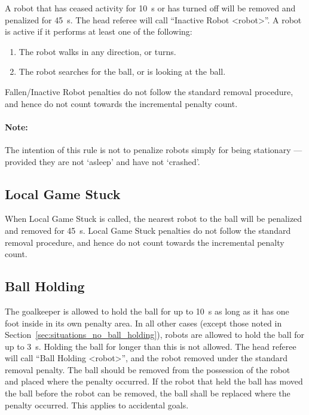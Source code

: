 A robot that has ceased activity for \qty{10}{\second} or has turned off will be removed and penalized for \qty{45}{\second}.
The head referee will call ``Inactive Robot  \textless robot\textgreater''.
A robot is active if it performs at least one of the following:
\begin{enumerate}
  \item The robot walks in any direction, or turns.
  \item The robot searches for the ball, or is looking at the ball.
\end{enumerate}

Fallen/Inactive Robot penalties do not follow the standard removal procedure, and hence do not count towards the incremental penalty count.

\paragraph{Note:} The intention of this rule is not to penalize robots simply for being stationary — provided they are not `asleep' and have not `crashed'.

\subsection{Local Game Stuck}
\label{sec:pen_local_game_stuck}

When Local Game Stuck is called, the nearest robot to the ball will be penalized and removed for \qty{45}{\second}. Local Game Stuck penalties do not follow the standard removal procedure, and hence do not count towards the incremental penalty count.


\subsection{Ball Holding}
\label{sec:ball_holding}

The goalkeeper is allowed to hold the ball for up to \qty{10}{\second} as long as it has one foot inside in its own penalty area.  In all other cases (except those noted in Section~\ref{sec:situations_no_ball_holding}), robots are allowed to hold the ball for up to \qty{3}{\second}. Holding the ball for longer than this is not allowed.
The head referee will call ``Ball Holding \textless robot\textgreater'', and the robot removed under the standard removal penalty.
The ball should be removed from the possession of the robot and placed where the penalty occurred.
If the robot that held the ball has moved the ball before the robot can be removed, the ball shall be replaced where the penalty occurred.
This applies to accidental goals.

